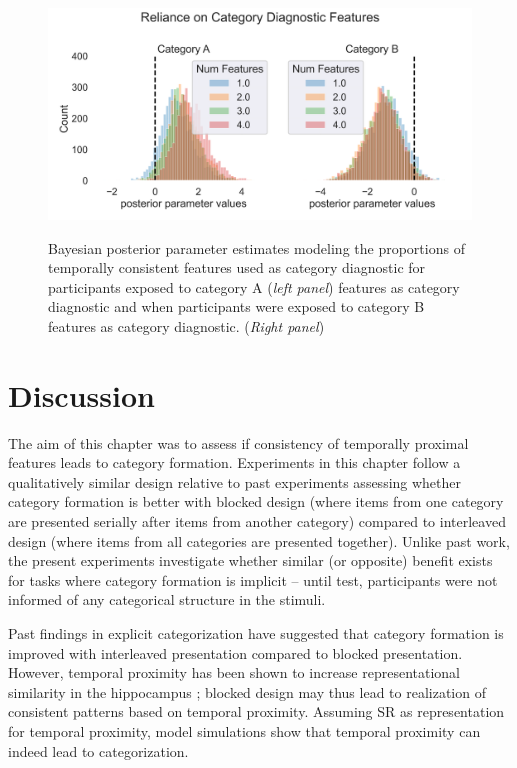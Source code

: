 \begin{figure}[h]
    \centering
    \caption{Bayesian posterior parameter estimates modeling the proportions of temporally consistent features used as category diagnostic for participants exposed to category A (\textit{left panel}) features as category diagnostic and when participants were exposed to category B features as category diagnostic. (\textit{Right panel})}
    \includegraphics[width = \textwidth]{chapter_notebooks/chapter_4/figures/exp5_bayesmodel_res.png}
    \label{fig:exp5-bayesian-estimates-proportions}
\end{figure}





\section{Discussion} 
The aim of this chapter was to assess if consistency of temporally proximal features leads to category formation. Experiments in this chapter follow a qualitatively similar design relative to past experiments assessing whether category formation is better with blocked design (where items from one category are presented serially after items from another category) compared to interleaved design (where items from all categories are presented together). Unlike past work, the present experiments investigate whether similar (or opposite) benefit exists for tasks where category formation is implicit -- until test, participants were not informed of any categorical structure in the stimuli. 

Past findings in explicit categorization have suggested that category formation is improved with interleaved presentation compared to blocked presentation. However, temporal proximity has been shown to increase representational similarity in the hippocampus \cite{schapiro2013neural}; blocked design may thus lead to realization of consistent patterns based on temporal proximity. Assuming SR as representation for temporal proximity, model simulations show that temporal proximity can indeed lead to categorization. 

